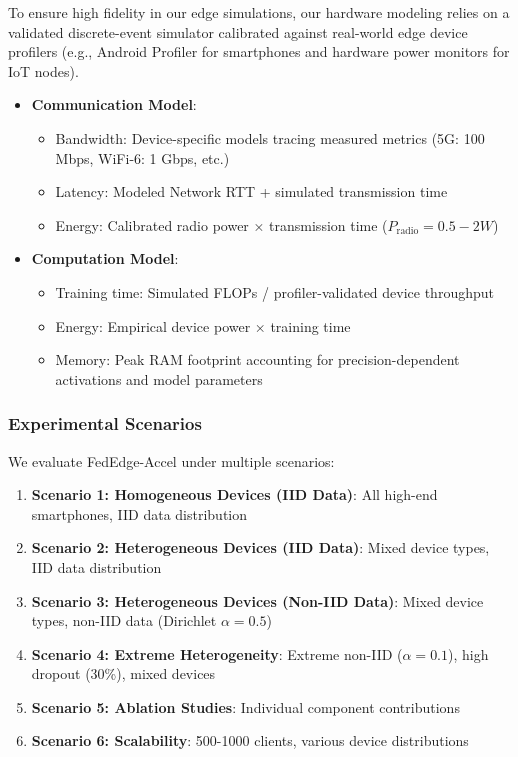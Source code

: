\documentclass[journal]{IEEEtran}
\begin{document}
To ensure high fidelity in our edge simulations, our hardware modeling relies on a validated discrete-event simulator calibrated against real-world edge device profilers (e.g., Android Profiler for smartphones and hardware power monitors for IoT nodes).
\begin{itemize}
    \item \textbf{Communication Model}: 
    \begin{itemize}
        \item Bandwidth: Device-specific models tracing measured metrics (5G: 100 Mbps, WiFi-6: 1 Gbps, etc.)
        \item Latency: Modeled Network RTT + simulated transmission time
        \item Energy: Calibrated radio power × transmission time ($P_{\text{radio}} = 0.5-2W$)
    \end{itemize}
    \item \textbf{Computation Model}:
    \begin{itemize}
        \item Training time: Simulated FLOPs / profiler-validated device throughput
        \item Energy: Empirical device power × training time
        \item Memory: Peak RAM footprint accounting for precision-dependent activations and model parameters
    \end{itemize}
\end{itemize}

\subsubsection{Experimental Scenarios}

We evaluate FedEdge-Accel under multiple scenarios:

\begin{enumerate}
    \item \textbf{Scenario 1: Homogeneous Devices (IID Data)}: All high-end smartphones, IID data distribution
    \item \textbf{Scenario 2: Heterogeneous Devices (IID Data)}: Mixed device types, IID data distribution
    \item \textbf{Scenario 3: Heterogeneous Devices (Non-IID Data)}: Mixed device types, non-IID data (Dirichlet $\alpha = 0.5$)
    \item \textbf{Scenario 4: Extreme Heterogeneity}: Extreme non-IID ($\alpha = 0.1$), high dropout (30\%), mixed devices
    \item \textbf{Scenario 5: Ablation Studies}: Individual component contributions
    \item \textbf{Scenario 6: Scalability}: 500-1000 clients, various device distributions
\end{enumerate}
\end{document}
